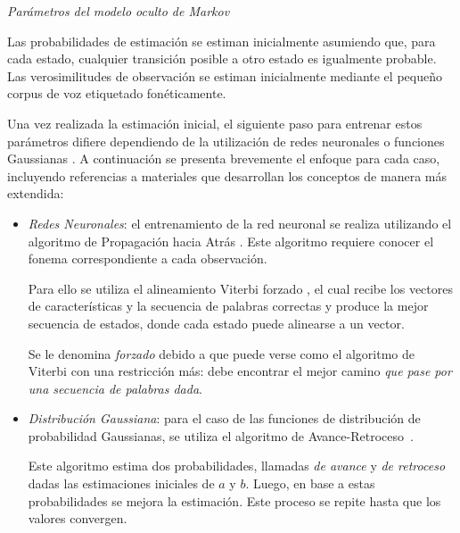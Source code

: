 \emph{Par\'ametros del modelo oculto de Markov} 

Las probabilidades de estimaci\'on se estiman inicialmente asumiendo que, para cada estado, cualquier transici\'on posible 
a otro estado es igualmente probable. Las verosimilitudes de observaci\'on se estiman inicialmente mediante el peque\~no corpus 
de voz etiquetado fon\'eticamente.

Una vez realizada la estimaci\'on inicial, el siguiente paso para entrenar estos par\'ametros difiere dependiendo de la utilizaci\'on
de redes neuronales o funciones Gaussianas \cite{Jurafsky}. A continuaci\'on se presenta brevemente el enfoque para cada caso, 
incluyendo referencias a materiales que desarrollan los conceptos de manera m\'as extendida:

\begin{itemize}
	\item \emph{Redes Neuronales}: el entrenamiento de la red neuronal se realiza utilizando el algoritmo de Propagaci\'on hacia 
	Atr\'as \cite{Russell2003Learning}. Este algoritmo requiere conocer el fonema correspondiente a cada observación. 

	Para ello se utiliza el alineamiento Viterbi forzado \cite{JelinekStatistical1998}, el cual recibe los vectores de características y la secuencia de palabras correctas y produce la mejor secuencia de estados, donde cada estado puede alinearse a un vector. 

	Se le denomina \emph{forzado} debido a que puede verse como el algoritmo de Viterbi con una restricción más: debe encontrar el mejor camino 
	\emph{que pase por una secuencia de palabras dada}.

	\item \emph{Distribuci\'on Gaussiana}: para el caso de las funciones de distribución de probabilidad Gaussianas, se utiliza
	el algoritmo de \mbox{Avance-Retroceso \cite{Jurafsky}}.

	Este algoritmo estima dos probabilidades, llamadas \emph{de avance} y \emph{de retroceso} dadas las estimaciones iniciales de
	$a$ y $b$. Luego, en base a estas probabilidades se mejora la estimación. Este proceso se repite hasta que los valores convergen.
\end{itemize}





